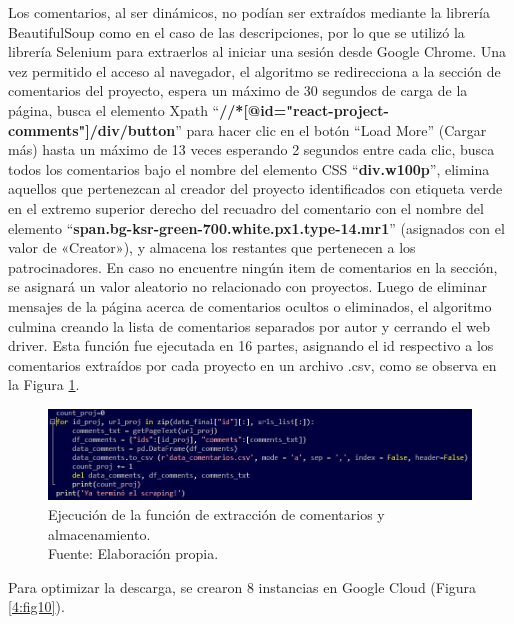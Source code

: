 Los comentarios, al ser dinámicos, no podían ser extraídos mediante la librería BeautifulSoup como en el caso de las descripciones, por lo que se utilizó la librería Selenium para extraerlos al iniciar una sesión desde Google Chrome. Una vez permitido el acceso al navegador, el algoritmo se redirecciona a la sección de comentarios del proyecto, espera un máximo de 30 segundos de carga de la página, busca el elemento Xpath “\textbf{//*[@id="react-project-comments"]/div/button}” para hacer clic en el botón “Load More” (Cargar más) hasta un máximo de 13 veces esperando 2 segundos entre cada clic, busca todos los comentarios bajo el nombre del elemento CSS “\textbf{div.w100p}”, elimina aquellos que pertenezcan al creador del proyecto identificados con etiqueta verde en el extremo superior derecho del recuadro del comentario con el nombre del elemento “\textbf{span.bg-ksr-green-700.white.px1.type-14.mr1}” (asignados con el valor de «Creator»), y almacena los restantes que pertenecen a los patrocinadores. En caso no encuentre ningún item de comentarios en la sección, se asignará un valor aleatorio no relacionado con proyectos. Luego de eliminar mensajes de la página acerca de comentarios ocultos o eliminados, el algoritmo culmina creando la lista de comentarios separados por autor y cerrando el web driver. Esta función fue ejecutada en 16 partes, asignando el id respectivo a los comentarios extraídos por cada proyecto en un archivo .csv, como se observa en la Figura \ref{4:fig9}.

\begin{figure}[!ht]
	\begin{center}
		\includegraphics[width=1\textwidth]{4/figures/comments_scraping_execution.jpg}
		\caption[Ejecución de la función de extracción de comentarios y almacenamiento]{Ejecución de la función de extracción de comentarios y almacenamiento.\\
			Fuente: Elaboración propia.}
		\label{4:fig9}
	\end{center}
\end{figure}

Para optimizar la descarga, se crearon 8 instancias en Google Cloud (Figura \ref{4:fig10}).

